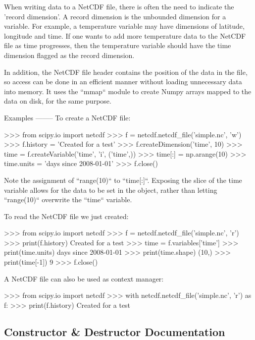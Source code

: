 \begin{DoxyVerb}
When writing data to a NetCDF file, there is often the need to indicate the
'record dimension'. A record dimension is the unbounded dimension for a
variable. For example, a temperature variable may have dimensions of
latitude, longitude and time. If one wants to add more temperature data to
the NetCDF file as time progresses, then the temperature variable should
have the time dimension flagged as the record dimension.

In addition, the NetCDF file header contains the position of the data in
the file, so access can be done in an efficient manner without loading
unnecessary data into memory. It uses the ``mmap`` module to create
Numpy arrays mapped to the data on disk, for the same purpose.

Examples
--------
To create a NetCDF file:

    >>> from scipy.io import netcdf
    >>> f = netcdf.netcdf_file('simple.nc', 'w')
    >>> f.history = 'Created for a test'
    >>> f.createDimension('time', 10)
    >>> time = f.createVariable('time', 'i', ('time',))
    >>> time[:] = np.arange(10)
    >>> time.units = 'days since 2008-01-01'
    >>> f.close()

Note the assignment of ``range(10)`` to ``time[:]``.  Exposing the slice
of the time variable allows for the data to be set in the object, rather
than letting ``range(10)`` overwrite the ``time`` variable.

To read the NetCDF file we just created:

    >>> from scipy.io import netcdf
    >>> f = netcdf.netcdf_file('simple.nc', 'r')
    >>> print(f.history)
    Created for a test
    >>> time = f.variables['time']
    >>> print(time.units)
    days since 2008-01-01
    >>> print(time.shape)
    (10,)
    >>> print(time[-1])
    9
    >>> f.close()

A NetCDF file can also be used as context manager:

    >>> from scipy.io import netcdf
    >>> with netcdf.netcdf_file('simple.nc', 'r') as f:
    >>>     print(f.history)
    Created for a test
\end{DoxyVerb}
 

\subsection{Constructor \& Destructor Documentation}
\hypertarget{classscipy_1_1io_1_1netcdf_1_1netcdf__file_ab163314326e36e86dd999697200e81c0}{}
